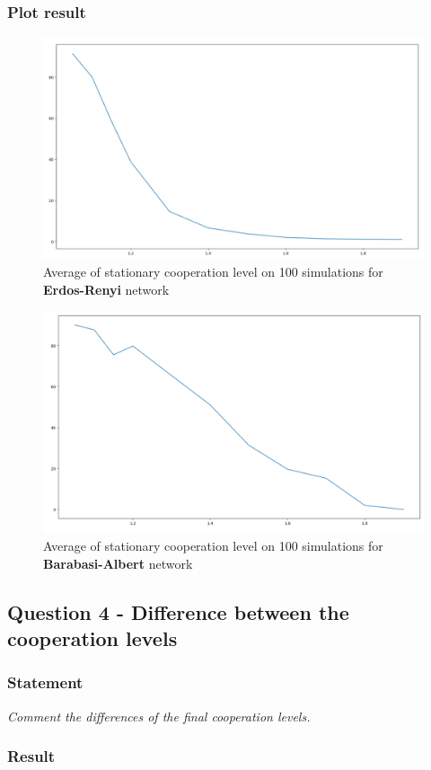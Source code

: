 \documentclass{article}
\begin{document}
\subsubsection{Plot result}

\begin{figure}[h]
  \centering
  \includegraphics[scale=0.32]{fig/ER-stationary-10sim.png}
  \caption{Average of stationary cooperation level on 100 simulations for \textbf{Erdos-Renyi} network}
  \label{fig:IPD-ER-average}
\end{figure}

\begin{figure}[h]
  \centering
  \includegraphics[scale=0.32]{fig/BA-stationary-10sim.png}
  \caption{Average of stationary cooperation level on 100 simulations for \textbf{Barabasi-Albert} network}
  \label{fig:IPD-BA-average}
\end{figure}

\subsection{Question 4 - Difference between the cooperation levels}

\subsubsection*{Statement}
\textit{Comment the differences of the final cooperation levels.}

\subsubsection{Result}
\end{document}
